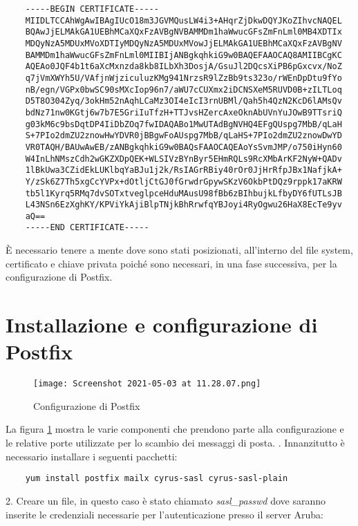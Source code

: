 \begin{verbatim}
    -----BEGIN CERTIFICATE-----
    MIIDLTCCAhWgAwIBAgIUcO18m3JGVMQusLW4i3+AHqrZjDkwDQYJKoZIhvcNAQEL
    BQAwJjELMAkGA1UEBhMCaXQxFzAVBgNVBAMMDm1haWwucGFsZmFnLml0MB4XDTIx
    MDQyNzA5MDUxMVoXDTIyMDQyNzA5MDUxMVowJjELMAkGA1UEBhMCaXQxFzAVBgNV
    BAMMDm1haWwucGFsZmFnLml0MIIBIjANBgkqhkiG9w0BAQEFAAOCAQ8AMIIBCgKC
    AQEAo0JQF4b1t6aXcMxnzda8kb8ILbXh3DosjA/GsuJl2DQcsXiPB6pGxcvx/NoZ
    q7jVmXWYh5U/VAfjnWjziculuzKMg941NrzsR9lZzBb9ts323o/rWEnDpDtu9fYo
    nB/egn/VGPx0bwSC90sMXcIop96n7/aWU7cCUXmx2iDCNSXeM5RUVD0B+zILTLoq
    D5T8O304Zyq/3okHm52nAqhLCaMz3OI4eIcI3rnUBMl/Qah5h4QzN2KcD6lAMsQv
    bdNz71nw0KGtj6w7b7E5GriIuTfzH+TTJvsHZercAxeOknAbUVnYuJOwB9TTsriQ
    g03kM6c9bsDqtDP4IiDbZOq7fwIDAQABo1MwUTAdBgNVHQ4EFgQUspg7MbB/qLaH
    S+7PIo2dmZU2znowHwYDVR0jBBgwFoAUspg7MbB/qLaHS+7PIo2dmZU2znowDwYD
    VR0TAQH/BAUwAwEB/zANBgkqhkiG9w0BAQsFAAOCAQEAoYsSvmJMP/o750iHyn60
    W4InLhNMszCdh2wGKZXDpQEK+WLSIVzBYnByr5EHmRQLs9RcXMbArKF2NyW+QADv
    1lBkUwa3CZidEkLUKlbqYaBJu1j2k/RsIAGrRBiy40rOr0JjHrRfpJBx1NafjkA+
    Y/zSk6Z7Th5xgCcYVPx+dOtljCtGJ0fGrwdrGpywSKzV6OkbPtDQz9rppk17aKRW
    tb5l1Kyrq5RMq7dvSOTxtveglpceHduMAusU98fBb6zBIhbujkLfbyDY6fUTLsJB
    L43NSn6EzXghKY/KPViYkAjiBlpTNjkBhRrwfqYBJoyi4RyOgwu26HaX8EcTe9yv
    aQ==
    -----END CERTIFICATE-----
\end{verbatim}
È necessario tenere a mente dove sono stati posizionati, all’interno del file system, 
certificato e chiave privata poiché sono necessari, in una fase successiva, per la configurazione di Postfix.

\section{Installazione e configurazione di Postfix}

\begin{figure}[htp]
    \centering
    \texttt{[image: Screenshot 2021-05-03 at 11.28.07.png]}
    \caption{Configurazione di Postfix}\label{confPostfix}
  \end{figure}
La figura \ref{confPostfix} mostra le varie componenti che prendono parte alla configurazione e le relative porte
utilizzate per lo scambio dei messaggi di posta.
\newline
{}. Innanzitutto è necessario installare i seguenti pacchetti:

\begin{verbatim}
    yum install postfix mailx cyrus-sasl cyrus-sasl-plain
\end{verbatim}
2. Creare un file, in questo caso è stato chiamato \textit{sasl\_passwd} dove saranno inserite le credenziali
necessarie per l'autenticazione presso il server Aruba:

